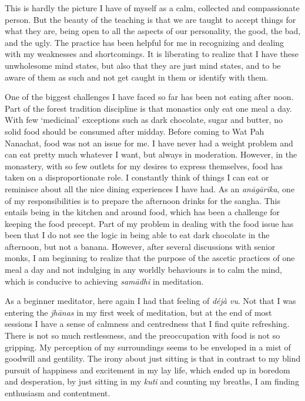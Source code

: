This is hardly the picture I have of myself as a calm, collected and
compassionate person. But the beauty of the teaching is that we are
taught to accept things for what they are, being open to all the aspects
of our personality, the good, the bad, and the ugly. The practice has
been helpful for me in recognizing and dealing with my weaknesses and
shortcomings. It is liberating to realize that I have these unwholesome
mind states, but also that they are just mind states, and to be aware of
them as such and not get caught in them or identify with them. 

One of the biggest challenges I have faced so far has been not eating
after noon. Part of the forest tradition discipline is that monastics
only eat one meal a day. With few `medicinal' exceptions such as dark
chocolate, sugar and butter, no solid food should be consumed after
midday. Before coming to Wat Pah Nanachat, food was not an issue for me. 
I have never had a weight problem and can eat pretty much whatever I
want, but always in moderation. However, in the monastery, with so few
outlets for my desires to express themselves, food has taken on a
disproportionate role. I constantly think of things I can eat or
reminisce about all the nice dining experiences I have had. As an
\emph{anāgārika}, one of my responsibilities is to prepare the afternoon
drinks for the sangha. This entails being in the kitchen and around
food, which has been a challenge for keeping the food precept. Part of
my problem in dealing with the food issue has been that I do not see the
logic in being able to eat dark chocolate in the afternoon, but not a
banana. However, after several discussions with senior monks, I am
beginning to realize that the purpose of the ascetic practices of one
meal a day and not indulging in any worldly behaviours is to calm the
mind, which is conducive to achieving \emph{samādhi} in meditation. 

As a beginner meditator, here again I had that feeling of \emph{déjà
vu}. Not that I was entering the \emph{jhānas} in my first week of
meditation, but at the end of most sessions I have a sense of calmness
and centredness that I find quite refreshing. There is not so much
restlessness, and the preoccupation with food is not so gripping. My
perception of my surroundings seems to be enveloped in a mist of
goodwill and gentility. The irony about just sitting is that in contrast
to my blind pursuit of happiness and excitement in my lay life, which
ended up in boredom and desperation, by just sitting in my \emph{kuti}
and counting my breaths, I am finding enthusiasm and contentment. 

